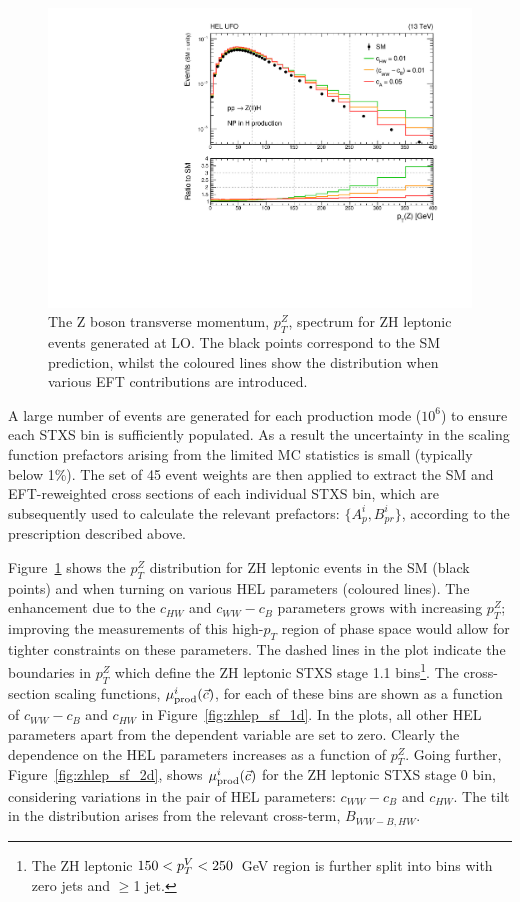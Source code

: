 \begin{figure}
  \centering
  \includegraphics[width=.8\textwidth]{Figures/eft/distributions/HEL_PTZ.pdf}
  \caption[$p_T^Z$ distribution for ZH leptonic events with HEL contributions]
  {
    The Z boson transverse momentum, $p_T^Z$, spectrum for ZH leptonic events generated at LO. The black points correspond to the SM prediction, whilst the coloured lines show the distribution when various EFT contributions are introduced.
  }
  \label{fig:zhlep_ptv}
\end{figure}

A large number of events are generated for each production mode ($10^6$) to ensure each STXS bin is sufficiently populated. As a result the uncertainty in the scaling function prefactors arising from the limited MC statistics is small (typically below 1\%). The set of 45 event weights are then applied to extract the SM and EFT-reweighted cross sections of each individual STXS bin, which are subsequently used to calculate the relevant prefactors: $\{A^i_p,B^i_{pr}\}$, according to the prescription described above. 


Figure~\ref{fig:zhlep_ptv} shows the $p_T^Z$ distribution for ZH leptonic events in the SM (black points) and when turning on various HEL parameters (coloured lines). The enhancement due to the $c_{HW}$ and $c_{WW}-c_B$ parameters grows with increasing $p_T^Z$; improving the measurements of this high-$p_T$ region of phase space would allow for tighter constraints on these parameters. The dashed lines in the plot indicate the boundaries in $p_T^Z$ which define the ZH leptonic STXS stage 1.1 bins\footnote{The ZH leptonic $150<p_T^V<250$~GeV region is further split into bins with zero jets and $\geq$1 jet.}. The cross-section scaling functions, $\mu_{\rm{prod}}^i(\vec{c})$, for each of these bins are shown as a function of $c_{WW}-c_B$ and $c_{HW}$ in Figure~\ref{fig:zhlep_sf_1d}. In the plots, all other HEL parameters apart from the dependent variable are set to zero. Clearly the dependence on the HEL parameters increases as a function of $p_T^Z$. Going further, Figure~\ref{fig:zhlep_sf_2d}, shows $\mu_{\rm{prod}}^i(\vec{c})$ for the ZH leptonic STXS stage 0 bin, considering variations in the pair of HEL parameters: $c_{WW}-c_B$ and $c_{HW}$. The tilt in the distribution arises from the relevant cross-term, $B_{WW-B,HW}$.

